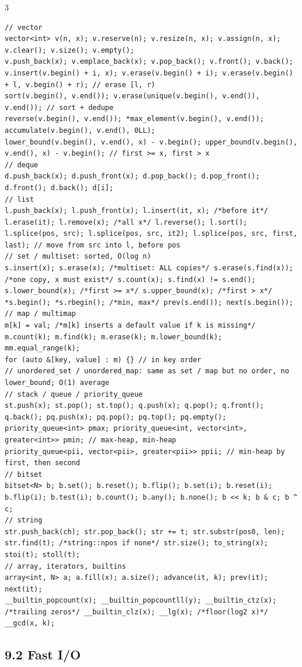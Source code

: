 \documentclass[8pt]{extarticle}
\begin{document}
\begin{multicols*}{3}
\begin{lstlisting}
// vector
vector<int> v(n, x); v.reserve(n); v.resize(n, x); v.assign(n, x); v.clear(); v.size(); v.empty();
v.push_back(x); v.emplace_back(x); v.pop_back(); v.front(); v.back();
v.insert(v.begin() + i, x); v.erase(v.begin() + i); v.erase(v.begin() + l, v.begin() + r); // erase [l, r)
sort(v.begin(), v.end()); v.erase(unique(v.begin(), v.end()), v.end()); // sort + dedupe
reverse(v.begin(), v.end()); *max_element(v.begin(), v.end()); accumulate(v.begin(), v.end(), 0LL);
lower_bound(v.begin(), v.end(), x) - v.begin(); upper_bound(v.begin(), v.end(), x) - v.begin(); // first >= x, first > x
// deque
d.push_back(x); d.push_front(x); d.pop_back(); d.pop_front(); d.front(); d.back(); d[i];
// list
l.push_back(x); l.push_front(x); l.insert(it, x); /*before it*/ l.erase(it); l.remove(x); /*all x*/ l.reverse(); l.sort();
l.splice(pos, src); l.splice(pos, src, it2); l.splice(pos, src, first, last); // move from src into l, before pos
// set / multiset: sorted, O(log n)
s.insert(x); s.erase(x); /*multiset: ALL copies*/ s.erase(s.find(x)); /*one copy, x must exist*/ s.count(x); s.find(x) != s.end();
s.lower_bound(x); /*first >= x*/ s.upper_bound(x); /*first > x*/ *s.begin(); *s.rbegin(); /*min, max*/ prev(s.end()); next(s.begin());
// map / multimap
m[k] = val; /*m[k] inserts a default value if k is missing*/ m.count(k); m.find(k); m.erase(k); m.lower_bound(k); mm.equal_range(k);
for (auto &[key, value] : m) {} // in key order
// unordered_set / unordered_map: same as set / map but no order, no lower_bound; O(1) average
// stack / queue / priority_queue
st.push(x); st.pop(); st.top(); q.push(x); q.pop(); q.front(); q.back(); pq.push(x); pq.pop(); pq.top(); pq.empty();
priority_queue<int> pmax; priority_queue<int, vector<int>, greater<int>> pmin; // max-heap, min-heap
priority_queue<pii, vector<pii>, greater<pii>> ppii; // min-heap by first, then second
// bitset
bitset<N> b; b.set(); b.reset(); b.flip(); b.set(i); b.reset(i); b.flip(i); b.test(i); b.count(); b.any(); b.none(); b << k; b & c; b ^ c;
// string
str.push_back(ch); str.pop_back(); str += t; str.substr(pos0, len); str.find(t); /*string::npos if none*/ str.size(); to_string(x); stoi(t); stoll(t);
// array, iterators, builtins
array<int, N> a; a.fill(x); a.size(); advance(it, k); prev(it); next(it);
__builtin_popcount(x); __builtin_popcountll(y); __builtin_ctz(x); /*trailing zeros*/ __builtin_clz(x); __lg(x); /*floor(log2 x)*/ __gcd(x, k);
\end{lstlisting}

\subsection*{9.2 Fast I/O}


\end{multicols*}
\end{document}
